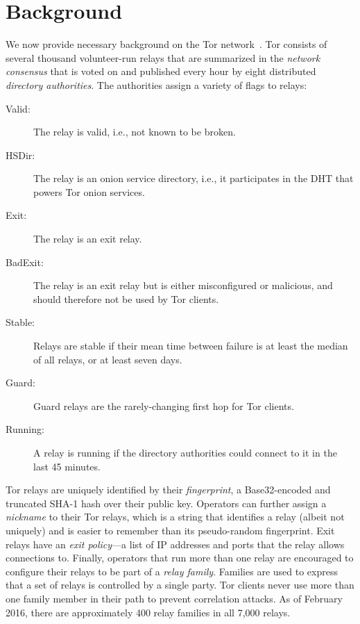 \section{Background}
\label{sec:background}
We now provide necessary background on the Tor network~\cite{Dingledine2004a}.
Tor consists of several thousand volunteer-run relays that are summarized in the
\emph{network consensus} that is voted on and published every hour by eight
distributed \emph{directory authorities}.  The authorities assign a variety of
flags to relays:

\begin{description}
	\item[Valid:] The relay is valid, i.e., not known to be broken.
	\item[HSDir:] The relay is an onion service directory, i.e., it participates
		in the DHT that powers Tor onion services.
	\item[Exit:] The relay is an exit relay.
	\item[BadExit:] The relay is an exit relay but is either misconfigured or
		malicious, and should therefore not be used by Tor clients.
	\item[Stable:] Relays are stable if their mean time between failure is at
		least the median of all relays, or at least seven days.
	\item[Guard:] Guard relays are the rarely-changing first hop for Tor clients.
	\item[Running:] A relay is running if the directory authorities could
		connect to it in the last 45 minutes.
\end{description}

Tor relays are uniquely identified by their \emph{fingerprint}, a Base32-encoded
and truncated SHA-1 hash over their public key.  Operators can further assign a
\emph{nickname} to their Tor relays, which is a string that identifies a relay
(albeit not uniquely) and is easier to remember than its pseudo-random
fingerprint.  Exit relays have an \emph{exit policy}---a list of IP addresses
and ports that the relay allows connections to.  Finally, operators that run
more than one relay are encouraged to configure their relays to be part of a
\emph{relay family}.  Families are used to express that a set of relays is
controlled by a single party.  Tor clients never use more than one family member
in their path to prevent correlation attacks.  As of February 2016, there are
approximately 400 relay families in all 7,000 relays.
